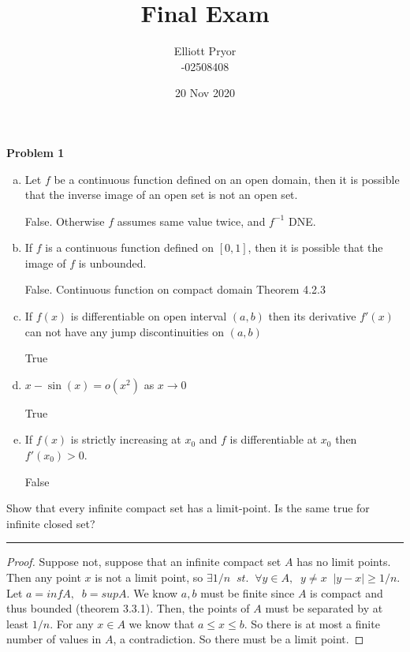 \documentclass[11pt]{article}
\title{Final Exam}
\author{Elliott Pryor\\
-02508408}
\date{20 Nov 2020}
\renewcommand{\sp}{\; \;}
\begin{document}
\maketitle

\large{\textbf{Problem 1}}

\begin{enumerate}[a)]
	\item Let $f$ be a continuous function defined on an open domain, then it is possible that the inverse image of an open set is not an open set.
	
	False. Otherwise $f$ assumes same value twice, and $f^{-1}$ DNE.
	
	\item If $f$ is a continuous function defined on $[0, 1]$, then it is possible that the image of $f$ is unbounded.
	
	False. Continuous function on compact domain Theorem 4.2.3
	
	\item If $f(x)$ is differentiable on open interval $(a,b)$ then its derivative $f'(x)$ can not have any jump discontinuities on $(a,b)$
	
	True
	
	\item $x - \sin(x) = o (x^2)$ as $x \to 0$
	
	True
	
	\item If $f(x)$ is strictly increasing at $x_0$ and $f$ is differentiable at $x_0$ then $f'(x_0) > 0$.
	
	False

\end{enumerate}


Show that every infinite compact set has a limit-point. Is the same true for infinite closed
set?

\hrule


\begin{proof}

Suppose not, suppose that an infinite compact set $A$ has no limit points. Then any point $x$ is not a limit point, so $\exists 1/n \sp st. \sp \forall y \in A, \sp y \neq x \sp |y - x| \geq 1/n$. 
Let $a = inf A, \sp b = sup A$. We know $a,b$ must be finite since $A$ is compact and thus bounded (theorem 3.3.1).
Then, the points of $A$ must be separated by at least $1/n$. For any $x \in A$ we know that $a \leq x \leq b$. So there is at most a finite number of values in $A$, a contradiction. So there must be a limit point.
\end{proof}
\end{document}
